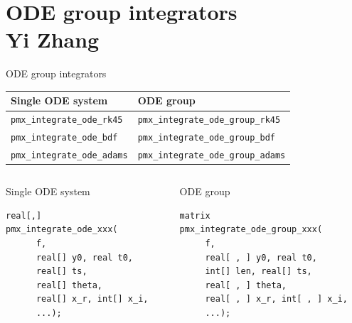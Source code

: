 \documentclass[presentation]{beamer}
\begin{document}
\section{ODE group integrators \\ \footnotesize{Yi Zhang}}
\label{sec:org2e0d4da}

\begin{frame}[fragile,label={sec:org7d34172}]{ODE group integrators}
 \begin{center}
\begin{tabular}{ll}
Single ODE system & ODE group\\
\hline
\texttt{pmx\_integrate\_ode\_rk45} & \texttt{pmx\_integrate\_ode\_group\_rk45}\\
\texttt{pmx\_integrate\_ode\_bdf} & \texttt{pmx\_integrate\_ode\_group\_bdf}\\
\texttt{pmx\_integrate\_ode\_adams} & \texttt{pmx\_integrate\_ode\_group\_adams}\\
\end{tabular}

\end{center}

\begin{columns}
\begin{column}{0.45\columnwidth}
\begin{block}{Single ODE system}
\begin{verbatim}
real[,]
pmx_integrate_ode_xxx(
      f,
      real[] y0, real t0,
      real[] ts,
      real[] theta,
      real[] x_r, int[] x_i,
      ...);
\end{verbatim}
\end{block}
\end{column}

\begin{column}{0.55\columnwidth}
\begin{block}{ODE group}
\begin{verbatim}
matrix
pmx_integrate_ode_group_xxx(
     f,
     real[ , ] y0, real t0,
     int[] len, real[] ts,
     real[ , ] theta,
     real[ , ] x_r, int[ , ] x_i,
     ...);
\end{verbatim}
\end{block}
\end{column}
\end{columns}
\end{frame}
\end{document}
